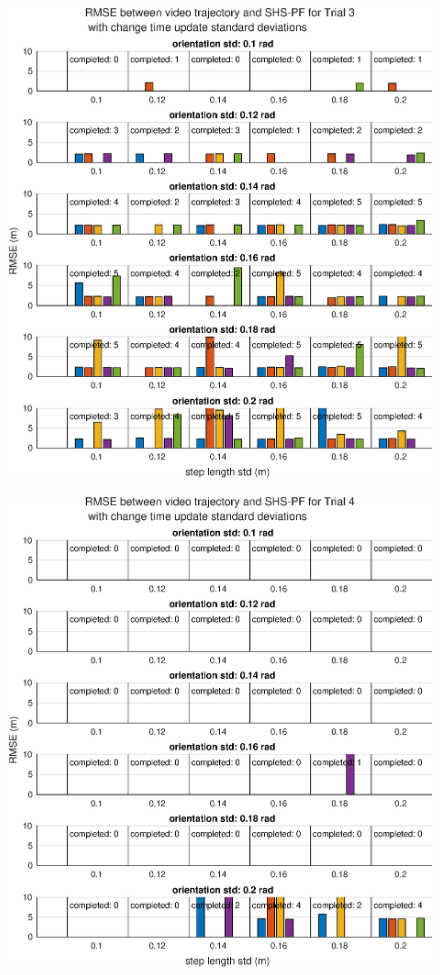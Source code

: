 \begin{figure}[H]
	\centering
	\includegraphics[width=0.6\linewidth]{images/20201201_0951_RMSE_between_video_trajectory_and_SHS-PF_for_Trial_3_1}
	\setlength{\belowcaptionskip}{-20pt}
	\caption{}
	\label{fig:202012010951rmsebetweenvideotrajectoryandshs-pffortrial31}
\end{figure}
\begin{figure}[H]
	\centering
	\includegraphics[width=0.6\linewidth]{images/20201201_0951_RMSE_between_video_trajectory_and_SHS-PF_for_Trial_4_1}
	\setlength{\belowcaptionskip}{-20pt}
	\caption{}
	\label{fig:202012010951rmsebetweenvideotrajectoryandshs-pffortrial41}
\end{figure}
